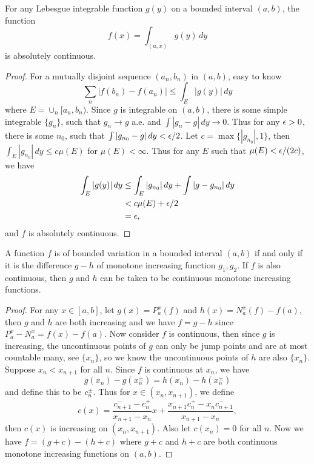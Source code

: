 \begin{pro}
	For any Lebesgue integrable function $g(y)$ on a bounded interval $(a,b)$, the function
	\[f(x)=\int_{(a,x)} g(y)\,dy\]is absolutely continuous.
\end{pro}
\begin{proof}
	For a mutually disjoint sequence $(a_n,b_n)$ in $(a,b)$, easy to know 
	\[\sum_{n} |f(b_n)-f(a_n)|\leq \int_{E} |g(y)|\,dy\]
	where $E=\cup_n [a_n,b_n)$. Since $g$ is integrable on $(a,b)$, there is some simple integrable $\{g_n\}$, such that
	$g_n\to g$ a.e. and $\int |g_n-g|\,dy\to 0$. Thus for any $\epsilon>0$, there is some $n_0$, such that $\int |g_{n_0}-g|\,dy<\epsilon/2$. Let $c=\max\{|g_{n_0}|,1\}$, then $\int_E |g_{n_0}|\,dy\leq c\mu(E)$ for $\mu(E)<\infty$. Thus for any $E$ such that $\mu(E)<\epsilon/(2c)$, we have
	\begin{align*}
	\int_{E} |g(y)|\,dy&\leq \int_{E} |g_{n_0}|\,dy+\int |g-g_{n_0}|\,dy\\
	&<c\mu(E)+\epsilon/2\\
	&=\epsilon,
	\end{align*}
	and $f$ is absolutely continuous.
\end{proof}

\begin{pro}%
	A function $f$ is of bounded variation in a bounded interval $(a,b)$ if and only if it is the difference $g-h$ of monotone increasing function $g_1,g_2$. If $f$ is also continuous, then $g$ and $h$ can be taken to be continuous monotone increasing functions.
\end{pro}
\begin{proof}
	For any $x\in[a,b]$, let $g(x)=P_a^x (f)$ and $h(x)=N_a^x (f)-f(a)$, then $g$ and $h$ are both increasing and we have $f=g-h$ since $P_a^x-N_a^x=f(x)-f(a)$. Now consider $f$ is continuous, then since $g$ is increasing, the uncontinuous points of $g$ can only be jump points and are at most countable many, see $\{x_n\}$, so we know the uncontinuous points of $h$ are also $\{x_n\}$. Suppose $x_{n}<x_{n+1}$ for all $n$. Since $f$ is continuous at $x_{n}$, we have
	\[g(x_n)-g(x_n^{\pm})=h(x_n)-h(x_n^{\pm})\] and define this to be $c_n^{\pm}$. Thus for $x\in(x_n,x_{n+1})$, we define 
	\[c(x)=\frac{c_{n+1}^--c_n^+}{x_{n+1}-x_n}x+\frac{x_{n+1}c_n^+-x_nc_{n+1}^-}{x_{n+1}-x_n},\]
	then $c(x)$ is increasing on $(x_n,x_{n+1})$.
	Also let $c(x_n)=0$ for all $n$. Now we have $f=(g+c)-(h+c)$ where $g+c$ and $h+c$ are both continuous monotone increasing functions on $(a,b)$.
\end{proof}

